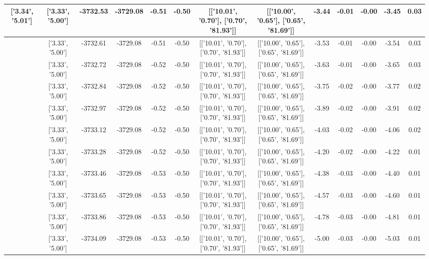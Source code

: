 \begin{table}[htbp]
\begin{adjustbox}{angle=90}
\begin{tabular}{|c|c|c|c|c|c|c|c|c|c|c|c|c|}
 ['3.34', '5.01'] & ['3.33', '5.00'] & -3732.53 & -3729.08 & -0.51 & -0.50 & [['10.01', '0.70'], ['0.70', '81.93']] & [['10.00', '0.65'], ['0.65', '81.69']] & -3.44 & -0.01 & -0.00 & -3.45 & 0.03\\ \hline
 ['3.34', '5.01'] & ['3.33', '5.00'] & -3732.61 & -3729.08 & -0.51 & -0.50 & [['10.01', '0.70'], ['0.70', '81.93']] & [['10.00', '0.65'], ['0.65', '81.69']] & -3.53 & -0.01 & -0.00 & -3.54 & 0.03\\ \hline
 ['3.34', '5.01'] & ['3.33', '5.00'] & -3732.72 & -3729.08 & -0.52 & -0.50 & [['10.01', '0.70'], ['0.70', '81.93']] & [['10.00', '0.65'], ['0.65', '81.69']] & -3.63 & -0.01 & -0.00 & -3.65 & 0.03\\ \hline
 ['3.34', '5.01'] & ['3.33', '5.00'] & -3732.84 & -3729.08 & -0.52 & -0.50 & [['10.01', '0.70'], ['0.70', '81.93']] & [['10.00', '0.65'], ['0.65', '81.69']] & -3.75 & -0.02 & -0.00 & -3.77 & 0.02\\ \hline
 ['3.34', '5.01'] & ['3.33', '5.00'] & -3732.97 & -3729.08 & -0.52 & -0.50 & [['10.01', '0.70'], ['0.70', '81.93']] & [['10.00', '0.65'], ['0.65', '81.69']] & -3.89 & -0.02 & -0.00 & -3.91 & 0.02\\ \hline
 ['3.34', '5.01'] & ['3.33', '5.00'] & -3733.12 & -3729.08 & -0.52 & -0.50 & [['10.01', '0.70'], ['0.70', '81.93']] & [['10.00', '0.65'], ['0.65', '81.69']] & -4.03 & -0.02 & -0.00 & -4.06 & 0.02\\ \hline
 ['3.34', '5.01'] & ['3.33', '5.00'] & -3733.28 & -3729.08 & -0.52 & -0.50 & [['10.01', '0.70'], ['0.70', '81.93']] & [['10.00', '0.65'], ['0.65', '81.69']] & -4.20 & -0.02 & -0.00 & -4.22 & 0.01\\ \hline
 ['3.34', '5.01'] & ['3.33', '5.00'] & -3733.46 & -3729.08 & -0.53 & -0.50 & [['10.01', '0.70'], ['0.70', '81.93']] & [['10.00', '0.65'], ['0.65', '81.69']] & -4.38 & -0.03 & -0.00 & -4.40 & 0.01\\ \hline
 ['3.35', '5.01'] & ['3.33', '5.00'] & -3733.65 & -3729.08 & -0.53 & -0.50 & [['10.01', '0.70'], ['0.70', '81.93']] & [['10.00', '0.65'], ['0.65', '81.69']] & -4.57 & -0.03 & -0.00 & -4.60 & 0.01\\ \hline
 ['3.35', '5.01'] & ['3.33', '5.00'] & -3733.86 & -3729.08 & -0.53 & -0.50 & [['10.01', '0.70'], ['0.70', '81.93']] & [['10.00', '0.65'], ['0.65', '81.69']] & -4.78 & -0.03 & -0.00 & -4.81 & 0.01\\ \hline
 ['3.35', '5.02'] & ['3.33', '5.00'] & -3734.09 & -3729.08 & -0.53 & -0.50 & [['10.01', '0.70'], ['0.70', '81.93']] & [['10.00', '0.65'], ['0.65', '81.69']] & -5.00 & -0.03 & -0.00 & -5.03 & 0.01\\ \hline

\end{tabular}
\end{adjustbox}
\end{table}
